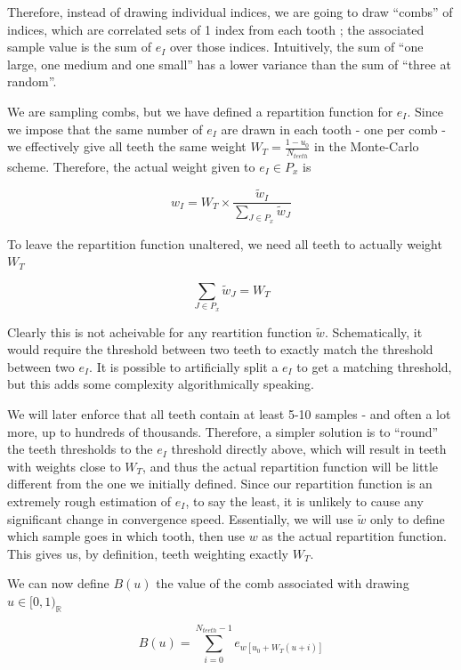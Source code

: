\documentclass[./thesis.tex]{subfiles}
\begin{document}
Therefore, instead of drawing individual indices, we are going to draw ``combs'' of indices, which are correlated sets of 1 index from each tooth ; the associated sample value is the sum of $e_I$ over those indices. Intuitively, the sum of ``one large, one medium and one small'' has a lower variance than the sum of ``three at random''.

We are sampling combs, but we have defined a repartition function for $e_I$. Since we impose that the same number of $e_I$ are drawn in each tooth - one per comb - we effectively give all teeth the same weight $W_T=\frac{1-u_0}{N_{teeth}}$ in the Monte-Carlo scheme. Therefore, the actual weight given to $e_I \in P_x$ is

\begin{equation}
w_I = W_T \times \frac{\tilde w_I}{\sum_{J \in P_x} \tilde w_J}
\end{equation}

To leave the repartition function unaltered, we need all teeth to actually weight $W_T$

\begin{equation}
\sum_{J \in P_x} \tilde w_J = W_T
\end{equation}

Clearly this is not acheivable for any reartition function $\tilde w$. Schematically, it would require the threshold between two teeth to exactly match the threshold between two $e_I$. It is possible to artificially split a $e_I$ to get a matching threshold, but this adds some complexity algorithmically speaking.

We will later enforce that all teeth contain at least 5-10 samples - and often a lot more, up to hundreds of thousands. Therefore, a simpler solution is to ``round'' the teeth thresholds to the $e_I$ threshold directly above, which will result in teeth with weights close to $W_T$, and thus the actual repartition function will be little different from the one we initially defined. Since our repartition function is an extremely rough estimation of $e_I$, to say the least, it is unlikely to cause any significant change in convergence speed.
Essentially, we will use $\tilde w$ only to define which sample goes in which tooth, then use $w$ as the actual repartition function. This gives us, by definition, teeth weighting exactly $W_T$.

We can now define $B(u)$ the value of the comb associated with drawing $u \in [0,1)_\mathbb{R}$

\begin{equation}
B(u) = \sum_{i=0}^{N_{teeth}-1} e_{w[u_0+ W_T(u+i)]}
\end{equation}
\end{document}
